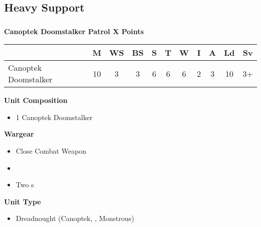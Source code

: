 \subsection{Heavy Support}

\newpage
\subsubsection[Canoptek Doomstalker Patrol]{}

\hspace{0.5em}
\begin{minipage}[t]{0.72\textwidth}
	{\large \textbf{Canoptek Doomstalker Patrol \dotfill X Points}}
	
	\begin{tabular}{m{165 pt} *{10}{c}}
		& M & WS & BS & S & T & W & I & A & Ld & Sv \\
		\hline
		Canoptek Doomstalker & 10 & 3 & 3 & 6 & 6 & 6 & 2 & 3 & 10 & 3+ \\
	\end{tabular}
	\small
	\begin{minipage}[t]{0.5\textwidth}
		\begin{flushleft}
			\vspace*{2em}
			\textbf{Unit Composition}
			\begin{itemize}
				\item 1 Canoptek Doomstalker
			\end{itemize}
			
			\textbf{Wargear}
			\begin{itemize}
				\item Close Combat Weapon
				\item {}
				\item Two s
			\end{itemize}
		\end{flushleft}
	\end{minipage}
	\begin{minipage}[t]{0.5\textwidth}
		\begin{flushleft}
			\vspace*{2em}
			\textbf{Unit Type}
			\begin{itemize}
				\item Dreadnought (Canoptek, , Monstrous)
			\end{itemize}
			

\end{flushleft}
\end{minipage}
\end{minipage}
